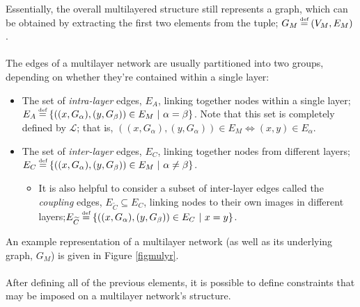 \documentclass[12pt,a4paper,twoside,openright]{report}
\newcommand\myeq{\stackrel{\mathclap{\tiny\mbox{def}}}{=}}
\begin{document}
\noindent Essentially, the overall multilayered structure still represents a graph, which can be obtained by extracting the first two elements from the tuple; $G_M \myeq (V_M, E_M)$.\\ \\ %
The edges of a multilayer network are usually partitioned into two groups, depending on whether they're contained within a single layer:
\begin{itemize}
	\item The set of \emph{intra-layer} edges, $E_A$, linking together nodes within a single layer;\linebreak $E_A \myeq \left\{((x, G_\alpha), (y, G_\beta)) \in E_M\ |\ \alpha = \beta \right\}$. Note that this set is completely defined by $\mathcal{L}$; that is, $((x, G_\alpha), (y, G_\alpha)) \in E_M \iff (x, y) \in E_\alpha$.
	\item The set of \emph{inter-layer} edges, $E_C$, linking together nodes from different layers;\linebreak $E_C \myeq \left\{((x, G_\alpha), (y, G_\beta)) \in E_M\ |\ \alpha \neq \beta \right\}$.
	\begin{itemize}
		\item It is also helpful to consider a subset of inter-layer edges called the \emph{coupling} edges, $E_{\widetilde{C}} \subseteq E_C$, linking nodes to their own images in different layers;\linebreak $E_{\widetilde{C}} \myeq \left\{((x, G_\alpha), (y, G_\beta)) \in E_C\ |\ x=y \right\}$.
	\end{itemize}
\end{itemize}
An example representation of a multilayer network (as well as its underlying graph, $G_M$) is given in Figure \ref{figmulyr}.\\ \\
After defining all of the previous elements, it is possible to define constraints that may be imposed on a multilayer network's structure.
\end{document}
